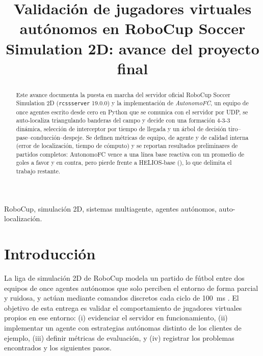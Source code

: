 \documentclass[conference,10pt]{IEEEtran}
\begin{document}
\title{Validación de jugadores virtuales autónomos en RoboCup Soccer Simulation 2D: avance del proyecto final}

\author{
}

\maketitle

\begin{abstract}
Este avance documenta la puesta en marcha del servidor oficial RoboCup Soccer
Simulation 2D (\texttt{rcssserver} 19.0.0) y la implementación de
\emph{AutonomoFC}, un equipo de once agentes escrito desde cero en Python que
se comunica con el servidor por UDP, se auto-localiza triangulando banderas del
campo y decide con una formación 4-3-3 dinámica, selección de interceptor por
tiempo de llegada y un árbol de decisión tiro--pase--conducción--despeje. Se
definen métricas de equipo, de agente y de calidad interna (error de
localización, tiempo de cómputo) y se reportan resultados preliminares de
\ExpTotal{} partidos completos: AutonomoFC vence a una línea base reactiva con
un promedio de \EAgoals{} goles a favor y \EAgoalsAgainst{} en contra, pero
pierde frente a HELIOS-base (\ECscores), lo que delimita el trabajo restante.
\end{abstract}

\begin{IEEEkeywords}
RoboCup, simulación 2D, sistemas multiagente, agentes autónomos, auto-localización.
\end{IEEEkeywords}

\section{Introducción}
La liga de simulación 2D de RoboCup modela un partido de fútbol entre dos
equipos de once agentes autónomos que solo perciben el entorno de forma
parcial y ruidosa, y actúan mediante comandos discretos cada ciclo de
100~ms \cite{rcssmanual}. El objetivo de esta entrega es validar el
comportamiento de jugadores virtuales propios en ese entorno: (i) evidenciar
el servidor en funcionamiento, (ii) implementar un agente con estrategias
autónomas distinto de los clientes de ejemplo, (iii) definir métricas de
evaluación, y (iv) registrar los problemas encontrados y los siguientes pasos.
\end{document}
